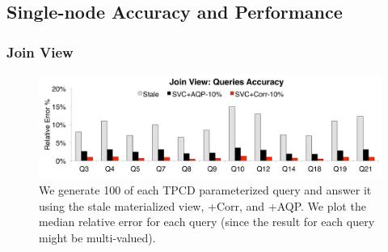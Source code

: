 \subsection{Single-node Accuracy and Performance}
\vspace{-.5em}
\subsubsection{Join View}



\begin{figure}[t]\vspace{-2em}
\centering
\includegraphics[scale=0.13]{exp/msj_3.pdf}\vspace{-.5em}
 \caption{We generate 100 of each TPCD parameterized query and answer it using the stale materialized view, \svcnospace+Corr, and \svcnospace+AQP. We plot the median relative error for each query (since the result for each query might be multi-valued).\label{exp-1-acc}}
\end{figure}

